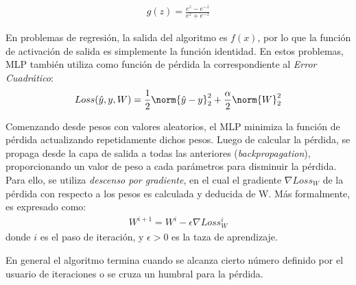     \begin{align}
      g(z) = \frac{e^{z} - e^{-z}}{e^{z} + e^{-z}}
    \end{align}

    En problemas de regresión, la salida del algoritmo es $f(x)$, por lo que la
    función de activación de salida es simplemente la función identidad. En estos
    problemas, MLP también utiliza como función de pérdida la correspondiente
    al \textit{Error Cuadrático}:
    \begin{align}
      Loss(\hat{y}, y, W) = \frac{1}{2} \norm{\hat{y} - y}^{2}_{2} + \frac{\alpha}{2} \norm{W}^{2}_{2}
    \end{align}

  \par Comenzando desde pesos con valores aleatorios, el MLP minimiza la función de
    pérdida actualizando repetidamente dichos pesos. Luego de calcular la pérdida,
    se propaga desde la capa de salida a todas las anteriores (\textit{backpropagation}),
    proporcionando un valor de peso a cada parámetros para disminuir la pérdida.
    Para ello, se utiliza \textit{descenso por gradiente}, en el cual el
    gradiente $\nabla Loss_{W}$ de la pérdida con respecto a los pesos es
    calculada y deducida de W.
    Más formalmente, es expresado como:
    \begin{align}
      W^{i + 1} = W^{i} - \epsilon \nabla Loss^{i}_{W}
    \end{align}
    donde $i$ es el paso de iteración, y $\epsilon > 0$ es la taza de aprendizaje.

    En general el algoritmo termina cuando se alcanza cierto número definido por el
    usuario de iteraciones o se cruza un humbral para la pérdida.




